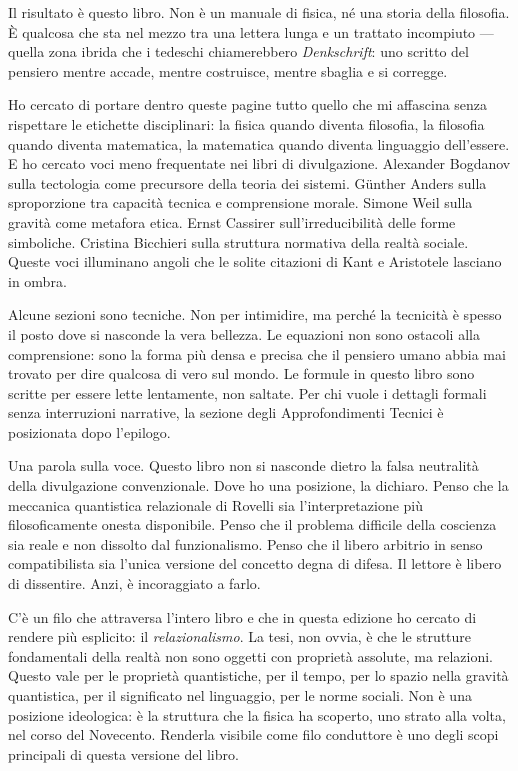 \documentclass[12pt,a4paper,openany]{book}
\begin{document}
Il risultato è questo libro. Non è un manuale di fisica, né una storia della filosofia. È qualcosa che sta nel mezzo tra una lettera lunga e un trattato incompiuto — quella zona ibrida che i tedeschi chiamerebbero \textit{Denkschrift}: uno scritto del pensiero mentre accade, mentre costruisce, mentre sbaglia e si corregge.

Ho cercato di portare dentro queste pagine tutto quello che mi affascina senza rispettare le etichette disciplinari: la fisica quando diventa filosofia, la filosofia quando diventa matematica, la matematica quando diventa linguaggio dell'essere. E ho cercato voci meno frequentate nei libri di divulgazione. Alexander Bogdanov sulla tectologia come precursore della teoria dei sistemi. Günther Anders sulla sproporzione tra capacità tecnica e comprensione morale. Simone Weil sulla gravità come metafora etica. Ernst Cassirer sull'irreducibilità delle forme simboliche. Cristina Bicchieri sulla struttura normativa della realtà sociale. Queste voci illuminano angoli che le solite citazioni di Kant e Aristotele lasciano in ombra.

Alcune sezioni sono tecniche. Non per intimidire, ma perché la tecnicità è spesso il posto dove si nasconde la vera bellezza. Le equazioni non sono ostacoli alla comprensione: sono la forma più densa e precisa che il pensiero umano abbia mai trovato per dire qualcosa di vero sul mondo. Le formule in questo libro sono scritte per essere lette lentamente, non saltate. Per chi vuole i dettagli formali senza interruzioni narrative, la sezione degli Approfondimenti Tecnici è posizionata dopo l'epilogo.

Una parola sulla voce. Questo libro non si nasconde dietro la falsa neutralità della divulgazione convenzionale. Dove ho una posizione, la dichiaro. Penso che la meccanica quantistica relazionale di Rovelli sia l'interpretazione più filosoficamente onesta disponibile. Penso che il problema difficile della coscienza sia reale e non dissolto dal funzionalismo. Penso che il libero arbitrio in senso compatibilista sia l'unica versione del concetto degna di difesa. Il lettore è libero di dissentire. Anzi, è incoraggiato a farlo.

C'è un filo che attraversa l'intero libro e che in questa edizione ho cercato di rendere più esplicito: il \textit{relazionalismo}. La tesi, non ovvia, è che le strutture fondamentali della realtà non sono oggetti con proprietà assolute, ma relazioni. Questo vale per le proprietà quantistiche, per il tempo, per lo spazio nella gravità quantistica, per il significato nel linguaggio, per le norme sociali. Non è una posizione ideologica: è la struttura che la fisica ha scoperto, uno strato alla volta, nel corso del Novecento. Renderla visibile come filo conduttore è uno degli scopi principali di questa versione del libro.
\end{document}
